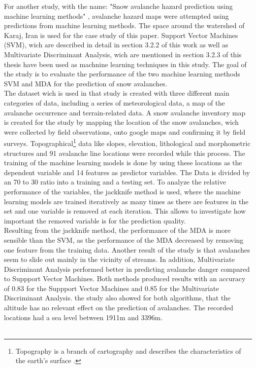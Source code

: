 \documentclass[../masterarbeit.tex]{subfiles}
\begin{document}
For another study, with the name: "Snow avalanche hazard prediction using machine learning methods" \textcite[]{Bahram:2019}, avalanche hazard maps were attempted using predictions from machine learning methods. The space around the watershed of Karaj, Iran is used for the case study of this paper. Support Vector Machines (SVM), wich are described in detail in section 3.2.2 of this work as well as Multivariate Discriminant Analysis, wich are mentioned in section 3.2.3 of this thesis have been used as machnine learning techniques in this study. The goal of the study is to evaluate the performance of the two machine learning methods SVM and MDA for the prediction of snow avalanches. \autocite[]{Bahram:2019} \\
The dataset wich is used in that study is created with three different main categories of data, including a series of meteorological data, a map of the avalanche occurrence and terrain-related data. A snow avalanche inventory map is created for the study by mapping the location of the snow avalanches, wich were collected by field observations, onto google maps and confirming it by field surveys. Topographical\footnote{Topography is a branch of cartography and describes the characteristics of the earth's surface \textcite[]{wortbedeutung_topografie:2022}.} data like slopes, elevation, lithological and morphometric structures and 91 avalanche line locations were recorded while this process.  The training of the machine learning models is done by using these locations as the dependent variable and 14 features as predictor variables. The Data is divided by an 70 to 30 ratio into a training and a testing set. To analyze the relative performance of the variables, the jackknife method is used, where the machine learning models are trained iteratively as many times as there are features in the set and one variable is removed at each iteration. This allows to investigate how important the removed variable is for the prediction quality. \autocite[]{Bahram:2019} \\
Resulting from the jackknife method, the performance of the MDA is more sensible than the SVM, as the performance of the MDA decreased by removing one feature from the training data. Another result of the study is that avalanches seem to slide out mainly in the vicinity of streams. In addition, Multivariate Discriminant Analysis performed better in predicting avalanche danger compared to Suppport Vector Machines. Both methods produced results with an accuracy of 0.83 for the Suppport Vector Machines and 0.85 for the Multivariate Discriminant Analysis. the study also showed for both algorithms, that the altitude has no relevant effect on the prediction of avalanches. The recorded locations had a sea level between 1911m and 3396m.  \autocite[]{Bahram:2019} \\~\\
\end{document}
